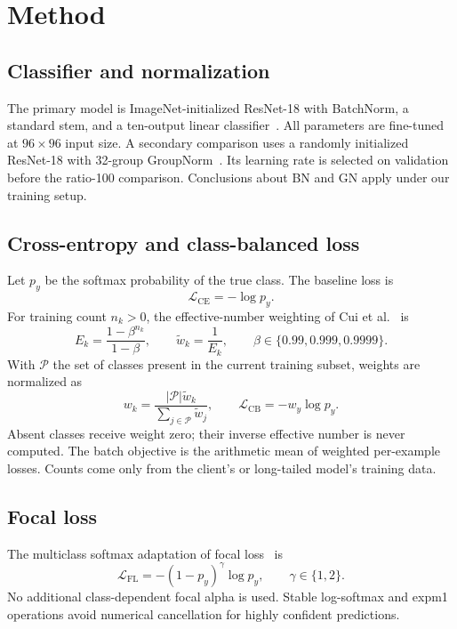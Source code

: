 \section{Method}
\subsection{Classifier and normalization}
The primary model is ImageNet-initialized ResNet-18 with BatchNorm, a standard stem, and a ten-output linear classifier~\cite{he2016}. All parameters are fine-tuned at $96\times96$ input size. A secondary comparison uses a randomly initialized ResNet-18 with 32-group GroupNorm~\cite{wu2018}. Its learning rate is selected on validation before the ratio-100 comparison. Conclusions about BN and GN apply under our training setup.

\subsection{Cross-entropy and class-balanced loss}
Let $p_y$ be the softmax probability of the true class. The baseline loss is
\begin{equation}
\mathcal{L}_{\mathrm{CE}}=-\log p_y.
\end{equation}
For training count $n_k>0$, the effective-number weighting of Cui et al.~\cite{cui2019} is
\begin{equation}
 E_k=\frac{1-\beta^{n_k}}{1-\beta},\qquad
 \widetilde w_k=\frac{1}{E_k},\qquad
 \beta\in\{0.99,0.999,0.9999\}.
\end{equation}
With $\mathcal P$ the set of classes present in the current training subset, weights are normalized as
\begin{equation}
 w_k=\frac{|\mathcal P|\widetilde w_k}{\sum_{j\in\mathcal P}\widetilde w_j},
 \qquad \mathcal L_{\mathrm{CB}}=-w_y\log p_y.
\end{equation}
Absent classes receive weight zero; their inverse effective number is never computed. The batch objective is the arithmetic mean of weighted per-example losses. Counts come only from the client's or long-tailed model's training data.

\subsection{Focal loss}
The multiclass softmax adaptation of focal loss~\cite{lin2017} is
\begin{equation}
 \mathcal L_{\mathrm{FL}}=-(1-p_y)^\gamma\log p_y,
 \qquad\gamma\in\{1,2\}.
\end{equation}
No additional class-dependent focal alpha is used. Stable log-softmax and expm1 operations avoid numerical cancellation for highly confident predictions.

